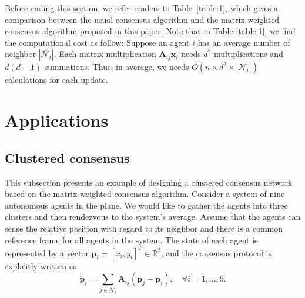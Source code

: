 \documentclass[draftclsnofoot,11pt,onecolumn]{IEEEtran}
\newcommand{\m}[1]{\mathbf{#1}}
\newcommand{\mc}[1]{\mathcal{#1}}
\newcommand{\mb}[1]{\mathbb{#1}}
\begin{document}
Before ending this section, we refer readers to Table~\ref{table:1}, which gives a comparison between the usual consensus algorithm and the matrix-weighted consensus algorithm proposed in this paper. Note that in Table \ref{table:1}, we find the computational cost as follow: Suppose an agent $i$ has an average number of neighbor $|\bar{\mc{N}_i}|$. Each matrix multiplication $\m{A}_{ij} \m{x}_i$ needs $d^2$ multiplications and $d(d-1)$ summations. Thus, in average, we needs $O(n \times d^2 \times |\bar{\mc{N}_i}|)$ calculations for each update.
\section{Applications}
\label{sec:5}
\subsection{Clustered consensus}
This subsection presents an example of designing a clustered consensus network based on the matrix-weighted consensus algorithm. 
Consider a system of nine autonomous agents in the plane. We would like to gather the agents into three clusters and then rendezvous to the system's average. Assume that the agents can sense the relative position with regard to its neighbor and there is a common reference frame for all agents in the system. The state of each agent is represented by a vector $\m{p}_i = [x_i,y_i]^T \in \mb{R}^2$, and the consensus protocol is explicitly written as 
$$\dot{\m{p}}_i = \sum_{j\in \mc{N}_i} \m{A}_{ij} (\m{p}_j - \m{p}_i),\quad \forall i = 1, \ldots, 9.$$ 
\end{document}
